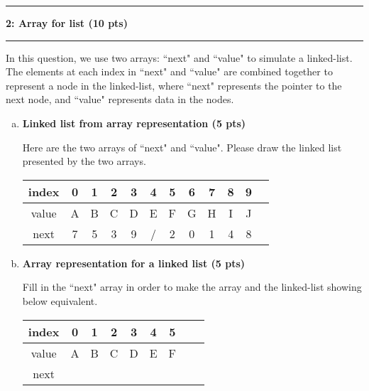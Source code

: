 \documentclass[10.5pt]{article}
\newcommand\question[2]{\vspace{.25in}\hrule\textbf{#1: #2}\vspace{.5em}\hrule\vspace{.10in}}
\begin{document}
	\pagebreak



	\question{2}{Array for list (10 pts)}
	In this question, we use two arrays: ``next" and ``value" to simulate a linked-list. 
	The elements at each index in ``next" and ``value" 
	are combined together to represent a node in the 
	linked-list, where ``next" represents the pointer 
	to the next node, and ``value" represents data in 
	the nodes.
	\begin{enumerate}[(a)]
		\item \textbf{Linked list from array representation (5 pts)}
		

		Here are the two arrays of ``next" and ``value".
		Please draw the linked list presented by the two arrays.
		\begin{center}
		\begin{tabular}{|c|c|c|c|c|c|c|c|c|c|c|c|}
			\hline
			index&0&1&2&3&4&5&6&7&8&9\\
			\hline
			value&A&B&C&D&E&F&G&H&I&J\\
			\hline
			next&7&5&3&9&/&2&0&1&4&8\\
			\hline

		\end{tabular}
			
	\end{center}
		\vspace{3cm}
		\item \textbf{Array representation for a linked list (5 pts)}
		 
		Fill in  the ``next" array in order to make the array and the linked-list showing below equivalent.

		\begin{center}
	
	\end{center}
		
	\begin{center}
		\begin{tabular}{|c|c|c|c|c|c|c|c|c|}
			\hline
			index&0&1&2&3&4&5\\
			\hline
			value&A&B&C&D&E&F\\
			\hline
			next&&&&&&\\
			\hline

		\end{tabular}
			
	\end{center}

	\end{enumerate}
\end{document}
